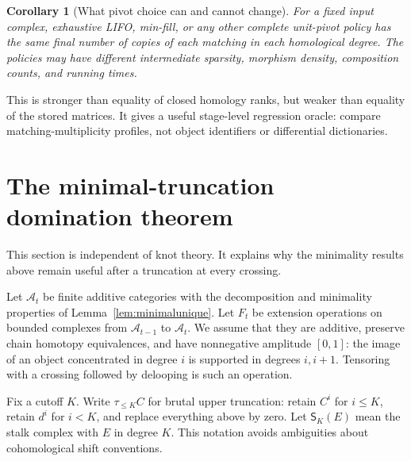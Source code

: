 \documentclass[11pt]{article}
\newtheorem{corollary}[theorem]{Corollary}
\theoremstyle{definition}\newtheorem{definition}[theorem]{Definition}
\theoremstyle{remark}\newtheorem{remark}[theorem]{Remark}
\newcommand{\tr}{\tau_{\leq K}}
\newcommand{\stalk}[2]{\mathsf S_{#1}(#2)}
\begin{document}
\begin{corollary}[What pivot choice can and cannot change]\label{cor:pivots}
For a fixed input complex, exhaustive LIFO, min-fill, or any other complete unit-pivot policy has the same final number of copies of each matching in each homological degree. The policies may have different intermediate sparsity, morphism density, composition counts, and running times.
\end{corollary}

This is stronger than equality of closed homology ranks, but weaker than equality of the stored matrices. It gives a useful stage-level regression oracle: compare matching-multiplicity profiles, not object identifiers or differential dictionaries.

\section{The minimal-truncation domination theorem}
\label{sec:domination}
This section is independent of knot theory. It explains why the minimality results above remain useful after a truncation at every crossing.

Let $\mathcal A_t$ be finite additive categories with the decomposition and minimality properties of Lemma~\ref{lem:minimalunique}. Let $F_t$ be extension operations on bounded complexes from $\mathcal A_{t-1}$ to $\mathcal A_t$. We assume that they are additive, preserve chain homotopy equivalences, and have nonnegative amplitude $[0,1]$: the image of an object concentrated in degree $i$ is supported in degrees $i,i+1$. Tensoring with a crossing followed by delooping is such an operation.

Fix a cutoff $K$. Write $\tr C$ for brutal upper truncation: retain $C^i$ for $i\leq K$, retain $d^i$ for $i<K$, and replace everything above by zero. Let $\stalk K E$ mean the stalk complex with $E$ in degree $K$. This notation avoids ambiguities about cohomological shift conventions.
\end{document}
